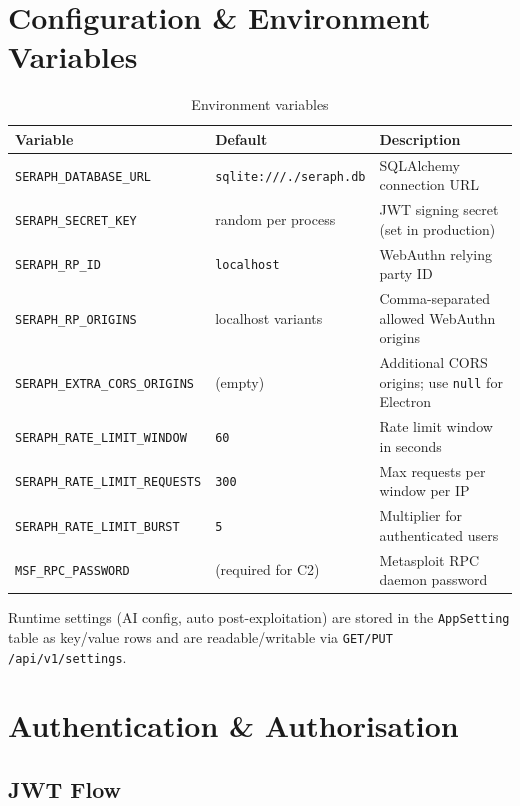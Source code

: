 \documentclass[11pt,a4paper,twoside,openright]{book}
\begin{document}
\section{Configuration \& Environment Variables}

\begin{table}[H]
\centering
\begin{tabularx}{\textwidth}{L{5.5cm} L{4cm} X}
\toprule
\textbf{Variable} & \textbf{Default} & \textbf{Description} \\
\midrule
\texttt{SERAPH\_DATABASE\_URL}    & \texttt{sqlite:///./seraph.db} & SQLAlchemy connection URL \\
\texttt{SERAPH\_SECRET\_KEY}      & random per process & JWT signing secret (set in production) \\
\texttt{SERAPH\_RP\_ID}           & \texttt{localhost}             & WebAuthn relying party ID \\
\texttt{SERAPH\_RP\_ORIGINS}      & localhost variants             & Comma-separated allowed WebAuthn origins \\
\texttt{SERAPH\_EXTRA\_CORS\_ORIGINS} & (empty)                    & Additional CORS origins; use \texttt{null} for Electron \\
\texttt{SERAPH\_RATE\_LIMIT\_WINDOW}  & \texttt{60}                & Rate limit window in seconds \\
\texttt{SERAPH\_RATE\_LIMIT\_REQUESTS}& \texttt{300}               & Max requests per window per IP \\
\texttt{SERAPH\_RATE\_LIMIT\_BURST}   & \texttt{5}                 & Multiplier for authenticated users \\
\texttt{MSF\_RPC\_PASSWORD}       & (required for C2)              & Metasploit RPC daemon password \\
\bottomrule
\end{tabularx}
\caption{Environment variables}
\end{table}

Runtime settings (AI config, auto post-exploitation) are stored in the \texttt{AppSetting} table as key/value rows and are readable/writable via \texttt{GET/PUT /api/v1/settings}.

\section{Authentication \& Authorisation}

\subsection{JWT Flow}
\end{document}

